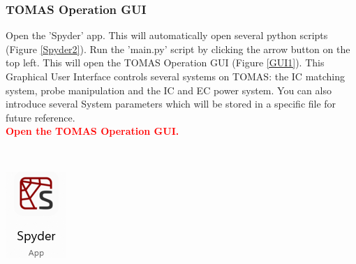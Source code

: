 \documentclass[fleqn,a4paper,20pt]{article}
\begin{document}
\begin{minipage}{.83\textwidth}
\subsubsection{TOMAS Operation GUI}

Open the 'Spyder' app. This will automatically open several python scripts (Figure 	\ref{Spyder2}). Run the 'main.py' script by clicking the arrow button on the top left. This will open the TOMAS Operation GUI (Figure \ref{GUI1}). This Graphical User Interface controls several systems on TOMAS: the IC matching system, probe manipulation and the IC and EC power system. You can also introduce several System parameters which will be stored in a specific file for future reference.\\

\textcolor{red}{\textbf{Open the TOMAS Operation GUI.}}\\
\end{minipage}
\begin{minipage}{.02\textwidth}
$\ $\\
\end{minipage}
\begin{minipage}{.15\textwidth}
\centering
\includegraphics[width=0.85\linewidth]{Spyder1}
\end{minipage}
\end{document}
